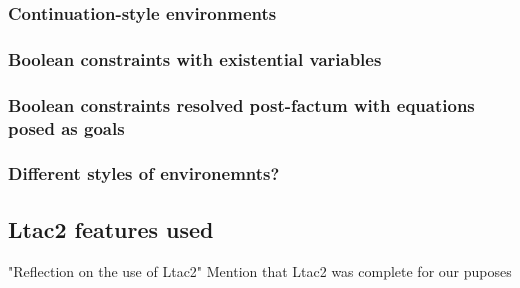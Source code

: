 \subsubsection{Continuation-style environments}

\subsubsection{Boolean constraints with existential variables}

\subsubsection{Boolean constraints resolved post-factum with equations posed as goals}

\subsubsection{Different styles of environemnts?}

\subsection{Ltac2 features used}

"Reflection on the use of Ltac2"
Mention that Ltac2 was complete for our puposes
